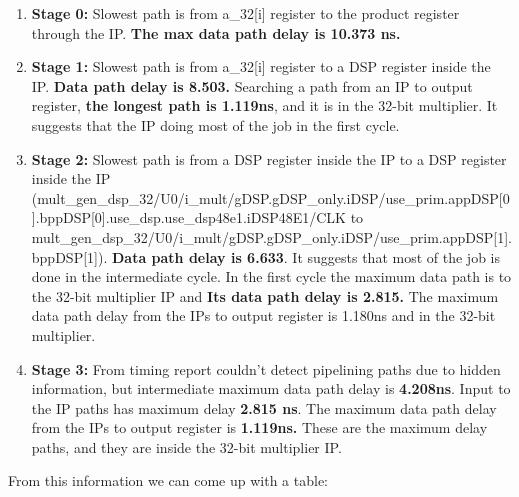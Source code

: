 \documentclass{report}
\begin{document}
\begin{enumerate}
    \item \textbf{Stage 0:} Slowest path is from a\_32[i] register to the product register through the IP. \textbf{The max data path delay is 10.373 ns.}
    \item \textbf{Stage 1:} Slowest path is from a\_32[i] register to a DSP register inside the IP. \textbf{Data path delay is 8.503.} Searching a path from an IP to output register, \textbf{the longest path is 1.119ns}, and it is in the 32-bit multiplier. It suggests that the IP doing most of the job in the first cycle.
    \item \textbf{Stage 2:} Slowest path is from a DSP  register inside the IP to a DSP  register inside the IP (mult\_gen\_dsp\_32/U0/i\_mult/gDSP.gDSP\_only.iDSP/use\_prim.appDSP[0].bppDSP[0].use\_dsp.use\_dsp48e1.iDSP48E1/CLK to mult\_gen\_dsp\_32/U0/i\_mult/gDSP.gDSP\_only.iDSP/use\_prim.appDSP[1].bppDSP[1]). \textbf{Data path delay is 6.633}. It suggests that most of the job is done in the intermediate cycle. In the first cycle the maximum data path is to the 32-bit multiplier IP and \textbf{Its data path delay is 2.815.} The maximum data path delay from the IPs to output register is 1.180ns and in the 32-bit multiplier.
    \item \textbf{Stage 3:} From timing report couldn't detect pipelining paths due to hidden information, but intermediate maximum data path delay is \textbf{4.208ns}. Input to the IP paths has maximum delay \textbf{2.815 ns}. The maximum data path delay from the IPs to output register is \textbf{1.119ns.} These are the maximum delay paths, and they are inside the 32-bit multiplier IP.
\end{enumerate}

From this information we can come up with a table:
\pagebreak
\end{document}
